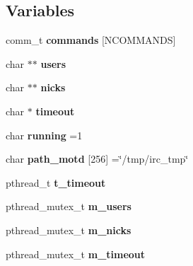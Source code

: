 \subsection*{Variables}
\begin{DoxyCompactItemize}
\item 
\hypertarget{G-2301-01-P1-irc__server_8c_acfddd784bea647bd026d2bd394a3b6f6}{}comm\+\_\+t {\bfseries commands} \mbox{[}N\+C\+O\+M\+M\+A\+N\+D\+S\mbox{]}\label{G-2301-01-P1-irc__server_8c_acfddd784bea647bd026d2bd394a3b6f6}

\item 
\hypertarget{G-2301-01-P1-irc__server_8c_a6ae2c7a383f917d118d3da486df676a6}{}char $\ast$$\ast$ {\bfseries users}\label{G-2301-01-P1-irc__server_8c_a6ae2c7a383f917d118d3da486df676a6}

\item 
\hypertarget{G-2301-01-P1-irc__server_8c_aa479d574f30eaead2ff90718e57bbf84}{}char $\ast$$\ast$ {\bfseries nicks}\label{G-2301-01-P1-irc__server_8c_aa479d574f30eaead2ff90718e57bbf84}

\item 
\hypertarget{G-2301-01-P1-irc__server_8c_ae5d87749ba74b510c676e8182185a71c}{}char $\ast$ {\bfseries timeout}\label{G-2301-01-P1-irc__server_8c_ae5d87749ba74b510c676e8182185a71c}

\item 
\hypertarget{G-2301-01-P1-irc__server_8c_a522cfaec64c9d8fcb626c0be8d8f7079}{}char {\bfseries running} =1\label{G-2301-01-P1-irc__server_8c_a522cfaec64c9d8fcb626c0be8d8f7079}

\item 
\hypertarget{G-2301-01-P1-irc__server_8c_a885e12002bebc5fc78e424462134357c}{}char {\bfseries path\+\_\+motd} \mbox{[}256\mbox{]} =\char`\"{}/tmp/irc\+\_\+tmp\char`\"{}\label{G-2301-01-P1-irc__server_8c_a885e12002bebc5fc78e424462134357c}

\item 
\hypertarget{G-2301-01-P1-irc__server_8c_a6a8db7f06775e12aa08f9b42385ca07b}{}pthread\+\_\+t {\bfseries t\+\_\+timeout}\label{G-2301-01-P1-irc__server_8c_a6a8db7f06775e12aa08f9b42385ca07b}

\item 
\hypertarget{G-2301-01-P1-irc__server_8c_a0dea934fa8395f37890ade78aaf73a8a}{}pthread\+\_\+mutex\+\_\+t {\bfseries m\+\_\+users}\label{G-2301-01-P1-irc__server_8c_a0dea934fa8395f37890ade78aaf73a8a}

\item 
\hypertarget{G-2301-01-P1-irc__server_8c_a7457b46c54b693945d40649bc0d7c855}{}pthread\+\_\+mutex\+\_\+t {\bfseries m\+\_\+nicks}\label{G-2301-01-P1-irc__server_8c_a7457b46c54b693945d40649bc0d7c855}

\item 
\hypertarget{G-2301-01-P1-irc__server_8c_ac92df69481bc8f15e3bc59dc3513e45d}{}pthread\+\_\+mutex\+\_\+t {\bfseries m\+\_\+timeout}\label{G-2301-01-P1-irc__server_8c_ac92df69481bc8f15e3bc59dc3513e45d}

\end{DoxyCompactItemize}


